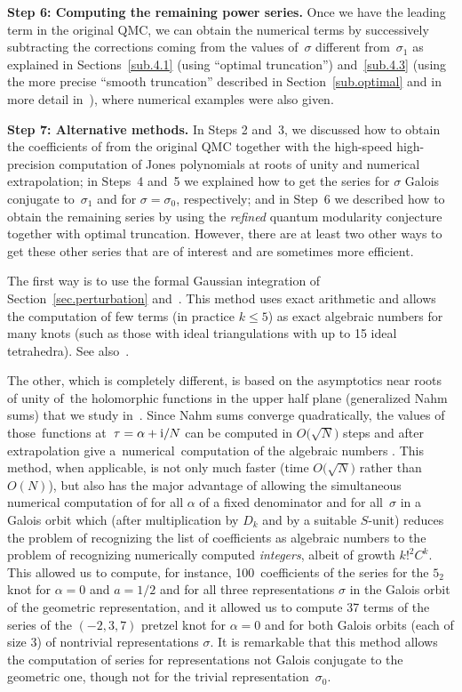 \documentclass[pdftex]{sigma}
\numberwithin{equation}{section}
\def\a{\alpha}
\def\a{\alpha}
\def\s{\sigma}
\begin{document}
{\bf Step 6: Computing the remaining power series.}
Once we have the leading term in the original QMC, we can obtain the numerical terms
by successively subtracting the corrections coming from the values of~$\s$ different
from~$\s_1$ as explained in Sections~\ref{sub.4.1} (using ``optimal truncation'')
and~\ref{sub.4.3} (using the more precise ``smooth truncation'' described
in Section~\ref{sub.optimal} and in more detail in~\cite{GZ:optimal}), where numerical
examples were also given.

{\bf Step 7: Alternative methods.}
In Steps 2 and~3, we discussed how to obtain the coefficients of \smash{$\Phi_\a^{(K,\s_1)}(h)$}
from the original QMC together with the high-speed high-precision computation of
Jones polynomials at roots of unity and numerical extrapolation; in Steps~4 and~5
we explained how to get the series \smash{$\Phi_\a^{(K,\s)}(h)$} for $\s$ Galois conjugate
to~$\s_1$ and for $\s=\s_0$, respectively; and in Step~6 we described how to obtain
the remaining series by using the \emph{refined} quantum modularity conjecture
together with optimal truncation. However, there are at least two other ways to get
these other series that are of interest and are sometimes more efficient.

The first way is to use the formal Gaussian integration of Section~\ref{sec.perturbation}
and~\cite{DG, DG2}. This method uses exact arithmetic and allows the computation of
few terms \smash{$A^{(K,\s)}_\a(k)$} (in practice $k \leq 5$) as exact algebraic numbers for
many knots (such as those with ideal triangulations with up to 15 ideal tetrahedra).
See also~\cite{Ga:exact}.

The other, which is completely different, is based on the asymptotics near roots of
unity of~the holomorphic functions in the upper half plane (generalized Nahm sums)
that we study in~\cite{GZ:qseries}. Since Nahm sums converge
quadratically, the values of those~functions at~$\tau=\a+{\rm i}/N$ can be computed in
$ O\big(\sqrt{N}\big)$ steps and after extrapolation give a~nu\-merical~com\-putation of
the algebraic numbers \smash{$A^{(K,\s)}_\a(k)$}. This method, when applicable, is not only
much faster (time $ O\big(\sqrt N\big)$ rather than $ O(N)$), but also has
the major advantage of allowing the simultaneous numerical computation of
\smash{$A^{(K,\s)}_\a(k)$} for all $\a$ of a fixed denominator and for all~$\s$ in a Galois
orbit which (after multiplication by $D_k$ and by a suitable $S$-unit)
reduces the problem of recognizing the list of coefficients \smash{$A^{(K,\s)}_\a(k)$} as
algebraic numbers to the problem of recognizing numerically computed \emph{integers},
albeit of growth $k!^2 C^k$. This allowed us to compute, for instance,
100~coefficients of the series \smash{$\Phi^{(K,\s)}_\a(h)$} for the $5_2$ knot for $\a=0$
and $a=1/2$ and for all three representations $\s$ in the Galois orbit of the
geometric representation,
and it allowed us to compute 37 terms of the series of the $(-2,3,7)$
pretzel knot for $\a=0$ and for both Galois orbits (each of size 3) of
nontrivial representations $\s$. It is remarkable that this method allows
the computation of series for representations not Galois conjugate to the
geometric one, though not for the trivial representation~$\s_0$.
\end{document}
